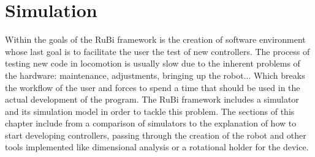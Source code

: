 \chapter{Simulation} %
\label{cha:simulation}
Within the goals of the RuBi framework is the creation of software environment whose last goal is to facilitate the user the test of new controllers.
The process of testing new code in locomotion is usually slow due to the inherent problems of the hardware: maintenance, adjustments, bringing up the robot...
Which breaks the workflow of the user and forces to spend a time that should be used in the actual development of the program.
The RuBi framework includes a simulator and its simulation model in order to tackle this problem.
The sections of this chapter include from a comparison of simulators to the explanation of how to start developing controllers, passing through the creation of the robot and other tools implemented like dimensional analysis or a rotational holder for the device.








